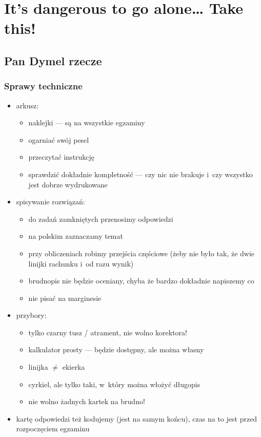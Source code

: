 \section*{It's dangerous to go alone\ldots{} Take this!}
\subsection*{Pan Dymel rzecze}
\subsubsection*{Sprawy techniczne}
\begin{itemize}
    \item arkusz:
        \begin{itemize}
            \item naklejki --- są na wszystkie egzaminy
            \item ogarniać swój pesel
            \item przeczytać instrukcję
            \item sprawdzić dokładnie kompletność --- czy nic nie brakuje i~czy wszystko jest dobrze wydrukowane
        \end{itemize}
    \item spisywanie rozwiązań:
        \begin{itemize}
            \item do zadań zamkniętych przenosimy odpowiedzi
            \item na polskim zaznaczamy temat
            \item przy obliczeniach robimy przejścia częściowe (żeby nie było tak, że dwie linijki rachunku i~od razu wynik)
            \item brudnopis nie będzie oceniany, chyba że bardzo dokładnie napiszemy co
            \item nie pisać na marginesie
        \end{itemize}
    \item przybory:
        \begin{itemize}
            \item tylko czarny tusz / atrament, nie wolno korektora!
            \item kalkulator prosty --- będzie dostępny, ale można własny
            \item linijka \(\neq\) ekierka
            \item cyrkiel, ale tylko taki, w~który można włożyć długopis
            \item nie wolno żadnych kartek na brudno!
        \end{itemize}
    \item kartę odpowiedzi też kodujemy (jest na samym końcu), czas na to jest przed rozpoczęciem egzaminu
\end{itemize}
